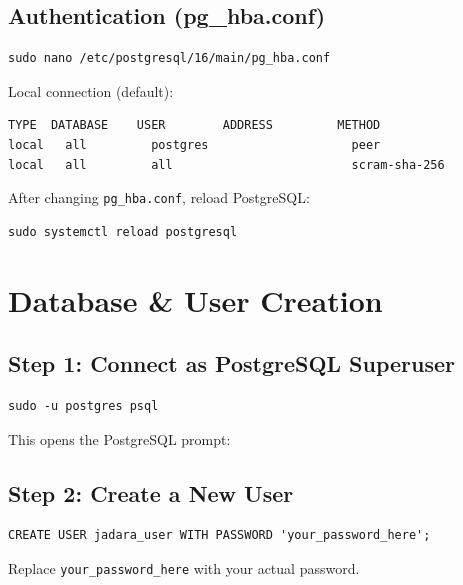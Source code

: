 \documentclass[11pt,a4paper]{article}
\begin{document}
\subsection{Authentication (pg\_hba.conf)}

\begin{lstlisting}[style=shell]
sudo nano /etc/postgresql/16/main/pg_hba.conf
\end{lstlisting}

Local connection (default):
\begin{lstlisting}
TYPE  DATABASE    USER        ADDRESS         METHOD
local   all         postgres                    peer
local   all         all                         scram-sha-256
\end{lstlisting}

\begin{notebox}
After changing \texttt{pg\_hba.conf}, reload PostgreSQL:
\begin{lstlisting}[style=shell]
sudo systemctl reload postgresql
\end{lstlisting}
\end{notebox}

\section{Database \& User Creation}

\subsection{Step 1: Connect as PostgreSQL Superuser}

\begin{lstlisting}[style=shell]
sudo -u postgres psql
\end{lstlisting}

This opens the PostgreSQL prompt:

\subsection{Step 2: Create a New User}

\begin{lstlisting}[style=sql]
CREATE USER jadara_user WITH PASSWORD 'your_password_here';
\end{lstlisting}

Replace \texttt{your\_password\_here} with your actual password.
\end{document}
